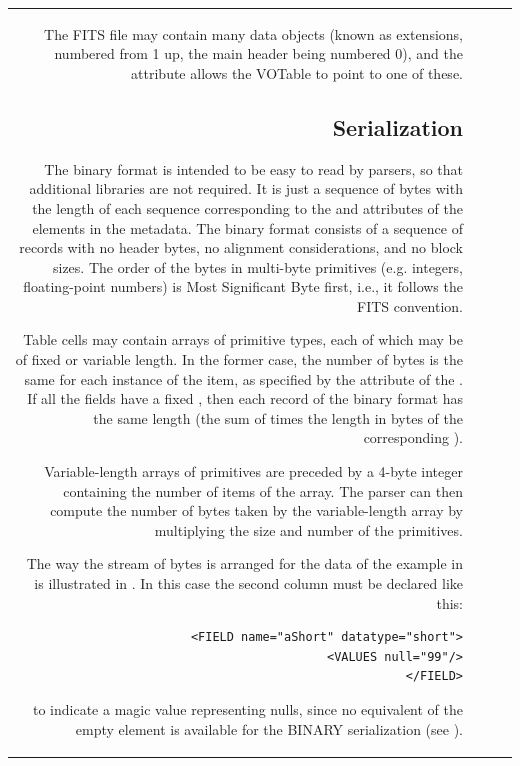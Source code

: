 \begin{tabular}{RRCp{0.8\textwidth}}
\begin{center}
{The FITS file may contain many data objects (known as extensions, 
numbered from 1 up, the main header being numbered 0), and the
 attribute allows the VOTable to point to one of
these.


\subsection{\texorpdfstring{ Serialization}
                           {BINARY Serialization}}
\label{sec:BIN}

The binary format is intended to be easy to read by parsers, so
that additional libraries are not required. It is just a sequence of
bytes with the length of each sequence corresponding to the {}
and {} attributes of the {}
elements in the metadata. The binary format consists of a sequence of
records with no header bytes, no alignment considerations, and no block sizes.
The order of the bytes in multi-byte primitives (e.g. integers,
floating-point numbers) is Most Significant Byte first, i.e.,
it follows the FITS convention.

Table cells may contain arrays of primitive types, each of which
may be of fixed or variable length. In the former case, the number of
bytes is the same for each instance of the item, as specified by the
{}
attribute of the {}.
If all the fields have a fixed {},
then each record of the binary format has the same length
(the sum of {}
times the length in bytes of the corresponding {}).

Variable-length arrays of primitives are preceded by a 4-byte integer
containing the number of items of the array.
The parser can then compute the number of bytes taken
by the variable-length array by multiplying the size and number 
of the primitives.

The way the stream of bytes is arranged for the data of the 
example in  is illustrated in 
.
In this case the second column must be declared like this:
\begin{verbatim}
  <FIELD name="aShort" datatype="short">
    <VALUES null="99"/>
  </FIELD>
\end{verbatim}
to indicate a magic value representing nulls, since no equivalent of the
empty  element is available for the BINARY serialization
(see ).

}
\end{center}
\end{tabular}
